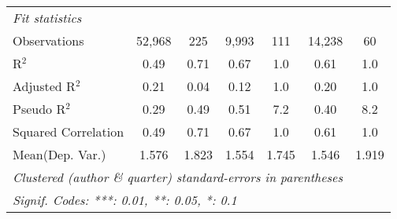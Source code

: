 \begin{tabular}{lcccccc}
   \midrule
   \emph{Fit statistics}\\
   Observations                                               & 52,968         & 225     & 9,993          & 111          & 14,238       & 60\\  
   R$^2$                                                      & 0.49           & 0.71    & 0.67           & 1.0          & 0.61         & 1.0\\  
   Adjusted R$^2$                                             & 0.21           & 0.04    & 0.12           & 1.0          & 0.20         & 1.0\\  
   Pseudo R$^2$                                               & 0.29           & 0.49    & 0.51           & 7.2          & 0.40         & 8.2\\  
   Squared Correlation                                        & 0.49           & 0.71    & 0.67           & 1.0          & 0.61         & 1.0\\  
Mean(Dep. Var.) & 1.576 & 1.823 & 1.554 & 1.745 & 1.546 & 1.919 \\
   \midrule \midrule
   \multicolumn{7}{l}{\emph{Clustered (author \& quarter) standard-errors in parentheses}}\\
   \multicolumn{7}{l}{\emph{Signif. Codes: ***: 0.01, **: 0.05, *: 0.1}}\\
\end{tabular}
\par\endgroup
